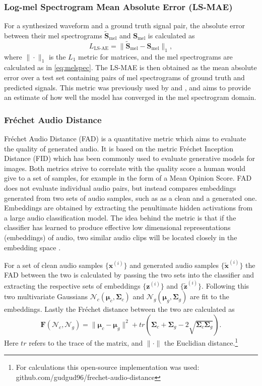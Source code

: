\documentclass{article}
\begin{document}
\subsubsection{Log-mel Spectrogram Mean Absolute Error (LS-MAE)}

For a synthesized waveform and a ground truth signal pair, the absolute error between their mel spectrograms $\tilde{\bm{S}}_{\text{mel}}$ and $\bm{S}_{\text{mel}}$ is calculated as
\begin{equation}
    L_{\text{LS-AE}} = \| \tilde{\bm{S}}_{\text{mel}} - \bm{S}_{\text{mel}} \|_1,
\end{equation}
where $\|\cdot \|_1$ is the $L_1$ metric for matrices, and the mel spectrograms are calculated as in \ref{eq:melspec}. The LS-MAE is then obtained as the mean absolute error over a test set containing pairs of mel spectrograms of ground truth and predicted signals. This metric was previously used by \cite{kong2020hifi} and \cite{lee2021priorgrad}, and aims to provide an estimate of how well the model has converged in the mel spectrogram domain.


\subsubsection{Fréchet Audio Distance}

Fréchet Audio Distance (FAD) \cite{kilgour2019frechet} is a quantitative metric which aims to evaluate the quality of generated audio. It is based on the metric Fréchet Inception Distance (FID) which has been commonly used to evaluate generative models for images. Both metrics strive to correlate with the quality score a human would give to a set of samples, for example in the form of a Mean Opinion Score. FAD does not evaluate individual audio pairs, but instead compares embeddings generated from two sets of audio samples, such as as a clean and a generated one. Embeddings are obtained by extracting the penultimate hidden activations from a large audio classification model. The idea behind the metric is that if the classifier has learned to produce effective low dimensional representations (embeddings) of audio, two similar audio clips will be located closely in the embedding space \cite{hershey2017cnn}.

For a set of clean audio samples $\{\bm{x}^{(i)}\}$ and generated audio samples $\{\tilde{\bm{x}}^{(i)}\}$ the FAD between the two is calculated by passing the two sets into the classifier and extracting the respective sets of embeddings $\{ \bm{z}^{(i)} \}$ and $\{ \tilde{\bm{z}}^{(i)} \}$. Following this two multivariate Gaussians $\mathcal{N}_c(\bm{\mu}_c, \bm{\Sigma}_c)$ and $\mathcal{N}_g(\bm{\mu}_g, \bm{\Sigma}_g)$ are fit to the embeddings. Lastly the Fréchet distance between the two are calculated as
\begin{equation}
    \textbf{F}(\mathcal{N}_c, \mathcal{N}_g) = \|\bm{\mu}_c - \bm{\mu}_g \|^2 + tr\left(\bm{\Sigma}_c + \bm{\Sigma}_g - 2\sqrt{\bm{\Sigma}_c \bm{\Sigma}_g}\right).
\end{equation}
Here $tr$ refers to the trace of the matrix, and $\| \cdot \|$ the Euclidian distance.\footnote{For calculations this open-source implementation was used: github.com/gudgud96/frechet-audio-distance}
\end{document}
